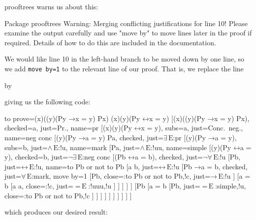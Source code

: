 \documentclass[10pt,british,a4paper,doc2]{ltxdoc}
\newcommand*\pkg[1]{\textsf{#1}}
\newcommand*{\lif}{\ensuremath{\mathbin{\rightarrow}}}
\newcommand*{\liff}{\ensuremath{\mathbin{\leftrightarrow}}}
\newcommand*{\elim}{\,\text{E}}
\begin{document}
\pkg{prooftrees} warns us about this:
\begin{latexcode}
Package prooftrees Warning: Merging conflicting justifications for line 10! Please examine the output carefully and use "move by" to move lines later in the proof if required. Details of how to do this are included in the documentation.
\end{latexcode}
We would like line 10 in the left-hand branch to be moved down by one line, so we add \verb|move by=1| to the relevant line of our proof.
That is, we replace the line
\begin{latexcode}
                  [{Pb \lif a = b}, checked, just=4 $\forall\elim$
\end{latexcode}
by
\begin{latexcode}
                  [{Pb \lif a = b}, checked, just=$\forall\elim$:mark, move by=1
\end{latexcode}
giving us the following code:
\begin{latexcode}
\begin{tableau}
  {
    to prove={(\exists x)((\forall y)(Py \lif x = y) \land Px) \sststile{}{} (\exists x)(\forall y)(Py \liff x = y)}
  }
  [{(\exists x)((\forall y)(Py \lif x = y) \land Px)}, checked=a, just=Pr., name=pr
    [{\lnot (\exists x)(\forall y)(Py \liff x = y)}, subs=a, just=Conc.~neg., name=neg conc
      [{(\forall y)(Py \lif a = y) \land Pa}, checked, just=$\exists\elim$:pr
        [{(\forall y)(Py \lif a = y)}, subs=b, just=$\land\elim$:!u, name=mark
          [Pa, just=$\land\elim$:!uu, name=simple
            [{\lnot (\forall y)(Py \liff a = y)}, checked=b, just=$\lnot\exists\elim$:neg conc
              [{\lnot (Pb \liff a = b)}, checked, just=$\lnot\forall\elim$:!u
                [Pb, just=$\liff\elim$:!u, name=to Pb or not to Pb
                 [a \neq b, just=$\liff\elim$:!u
                  [{Pb \lif a = b}, checked, just=$\forall\elim$:mark, move by=1
                      [\lnot Pb, close={:to Pb or not to Pb,!c}, just=$\lif\elim$:!u
                      ]
                      [{a = b}
                        [a \neq a, close={:!c}, just={$=\elim$:{!uuu,!u}}
                        ]
                      ]
                  ]
                ]
                ]
                [\lnot Pb
                 [{a = b}
                    [Pb, just={$=\elim$:{simple,!u}}, close={:to Pb or not to Pb,!c}
                    ]
                 ]
                ]
              ]
            ]
          ]
        ]
      ]
    ]
  ]
\end{tableau}
\end{latexcode}
which produces our desired result:
\end{document}
